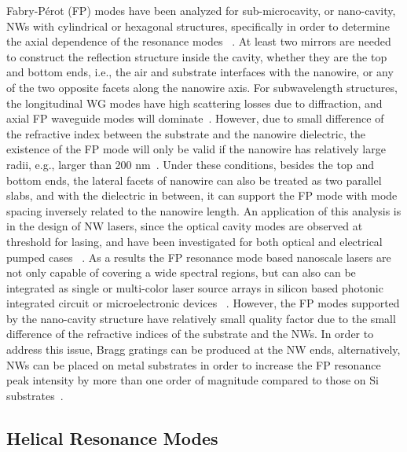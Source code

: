Fabry-P{\'e}rot (FP) modes have been analyzed for sub-microcavity, or nano-cavity,
NWs with cylindrical or hexagonal structures, specifically in order to
determine the axial dependence of the resonance modes ~\cite{Maslov:2003cq}. At
least two mirrors are needed to construct the reflection structure inside the
cavity, whether they are the top and bottom ends, i.e., the air and substrate
interfaces with the nanowire, or any of the two opposite facets along the
nanowire axis. For subwavelength structures, the longitudinal WG modes have
high scattering losses due to diffraction, and axial FP waveguide modes will
dominate~\cite{Johnson:2002ua}. However, due to small difference of the
refractive index between the substrate and the nanowire dielectric, the
existence of the FP mode will only be valid if the nanowire has relatively
large radii, e.g., larger than 200 nm~\cite{Hua:2007fn}. Under these
conditions, besides the top and bottom ends, the lateral facets of nanowire can
also be treated as two parallel slabs, and with the dielectric in between, it
can support the FP mode with mode spacing inversely related to the nanowire
length. An application of this analysis is in the design of NW lasers, since
the optical cavity modes are observed at threshold for lasing, and have been
investigated for both optical and electrical pumped cases
~\cite{Duan:2003en,Saxena:2015cn}. As a results the FP resonance mode based
nanoscale lasers are not only capable of covering a wide spectral regions, but
can also can be integrated as single or multi-color laser source arrays in
silicon based photonic integrated circuit or microelectronic devices
~\cite{Duan:2003en,Saxena:2015cn}. However, the FP modes supported by the
nano-cavity structure have relatively small quality factor due to the small
difference of the refractive indices of the substrate and the NWs. In order to
address this issue, Bragg gratings can be produced at the NW ends,
alternatively, NWs can be placed on metal substrates in order to increase the
FP resonance peak intensity by more than one order of magnitude compared to
those on Si substrates~\cite{Arab:2014wy}.

\subsection{Helical Resonance Modes}

